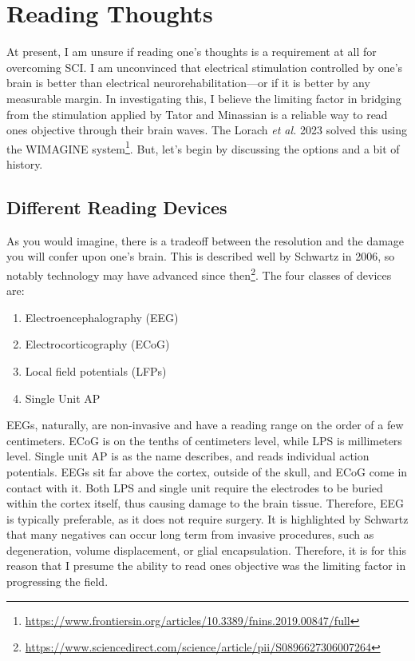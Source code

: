 \documentclass[12pt]{report}
\begin{document}
\section{Reading Thoughts} 

At present, I am unsure if reading one's thoughts is a requirement at all for overcoming SCI. I am unconvinced that electrical stimulation controlled by one's brain is better than electrical neurorehabilitation---or if it is better by any measurable margin. In investigating this, I believe the limiting factor in bridging from the stimulation applied by Tator and Minassian is a reliable way to read ones objective through their brain waves. The Lorach \textit{et al.} 2023 solved this using the WIMAGINE system\footnote{\url{https://www.frontiersin.org/articles/10.3389/fnins.2019.00847/full}}. But, let's begin by discussing the options and a bit of history.

\subsection{Different Reading Devices} As you would imagine, there is a tradeoff between the resolution and the damage you will confer upon one's brain. This is described well by Schwartz in 2006, so notably technology may have advanced since then\footnote{\url{https://www.sciencedirect.com/science/article/pii/S0896627306007264}}. The four classes of devices are: 
\begin{enumerate}
    \item Electroencephalography (EEG)
    \item Electrocorticography (ECoG)
    \item Local field potentials (LFPs)
    \item Single Unit AP
\end{enumerate}

EEGs, naturally, are non-invasive and have a reading range on the order of a few centimeters. ECoG is on the tenths of centimeters level, while LPS is millimeters level. Single unit AP is as the name describes, and reads individual action potentials. EEGs sit far above the cortex, outside of the skull, and ECoG come in contact with it. Both LPS and single unit require the electrodes to be buried within the cortex itself, thus causing damage to the brain tissue. Therefore, EEG is typically preferable, as it does not require surgery. It is highlighted by Schwartz that many negatives can occur long term from invasive procedures, such as degeneration, volume displacement, or glial encapsulation. Therefore, it is for this reason that I presume the ability to read ones objective was the limiting factor in progressing the field. \newline
\end{document}
